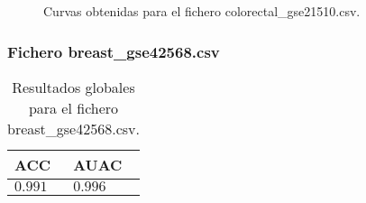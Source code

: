 \clearpage

\begin{figure}[htp]
    \centering
    \caption{Curvas obtenidas para el fichero colorectal\_gse21510.csv.}
    \label{fig:12}
\end{figure}

\bigbreak

\lipsum[1]

\clearpage



\subsubsection{Fichero breast\_gse42568.csv}

\begin{table}[htp]
    \small
    \centering
    \begin{tabularx}{\columnwidth}{Y Y}
        ACC       & AUAC    \\\hline
        $0.991$   & $0.996$ \\\hline
    \end{tabularx}
    \caption{Resultados globales para el fichero breast\_gse42568.csv.}
    \label{tab:16}
\end{table}

